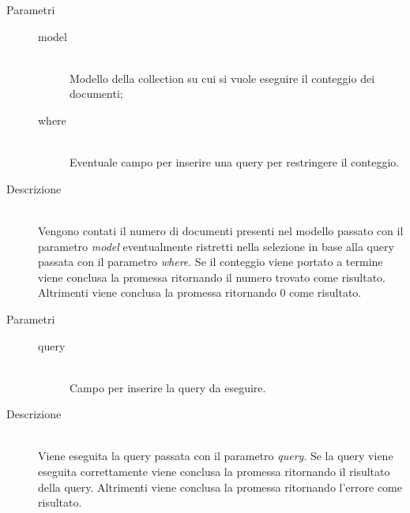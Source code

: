 \begin{description}
\begin{mldescription}
		 \hfill 
			\begin{description}
				\item[Parametri] \hfill
					\begin{description}
						\item[model] \hfill \\
							Modello della collection su cui si vuole eseguire il conteggio dei documenti;
						\item[where] \hfill \\
							Eventuale campo per inserire una query per restringere il conteggio.
					\end{description}
				\item[Descrizione] \hfill \\
Vengono contati il numero di documenti presenti nel modello passato con il parametro \textit{model} eventualmente ristretti nella selezione in base alla query passata con il parametro \textit{where}. Se il conteggio viene portato a termine viene conclusa la promessa ritornando il numero trovato come risultato. Altrimenti viene conclusa la promessa ritornando 0 come risultato.
				
			\end{description}
	
			 \hfill 
				\begin{description}
					\item[Parametri] \hfill
						\begin{description}
							\item[query] \hfill \\
								Campo per inserire la query da eseguire.
						\end{description}
					\item[Descrizione] \hfill \\
	Viene eseguita la query passata con il parametro \textit{query}. Se la query viene eseguita correttamente viene conclusa la promessa ritornando il risultato della query. Altrimenti viene conclusa la promessa ritornando l'errore come risultato.
					
				\end{description}
				

\end{mldescription}
\end{description}
